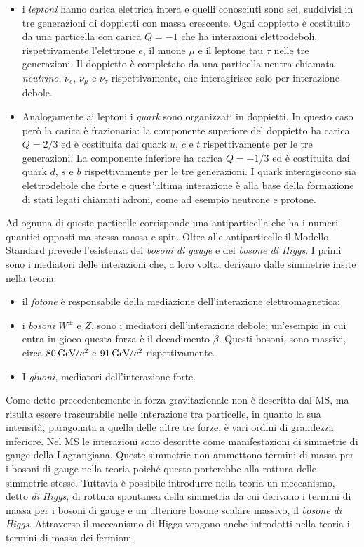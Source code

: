 \begin{itemize}
\item i {\em leptoni} hanno carica elettrica intera e quelli conosciuti sono sei, suddivisi in tre generazioni di doppietti con massa crescente. Ogni doppietto è costituito da una particella con carica $Q=-1$ che ha interazioni elettrodeboli, rispettivamente l'elettrone $e$, il muone $\mu$ e il leptone tau $\tau$ nelle tre generazioni. Il doppietto \`e completato da una particella neutra chiamata {\em neutrino}, $\nu_e$, $\nu_{\mu}$ e $\nu_{\tau}$ rispettivamente, che interagirisce solo per interazione debole.
\item Analogamente ai leptoni i {\em quark} sono organizzati in doppietti. In questo caso però la carica è frazionaria: la componente superiore del doppietto ha carica $Q=2/3$ ed \`e costituita dai quark $u$, $c$ e $t$ rispettivamente per le tre generazioni. La componente inferiore ha carica $Q=-1/3$ ed \`e costituita dai quark $d$, $s$ e $b$ rispettivamente per le tre generazioni. I quark interagiscono sia elettrodebole che forte e quest'ultima interazione è alla base della formazione di stati legati chiamati adroni, come ad esempio neutrone e protone.
\end{itemize}

Ad ognuna di queste particelle corrisponde una antiparticella che ha i numeri quantici opposti ma stessa massa e spin. Oltre alle antiparticelle il Modello Standard prevede l'esistenza dei {\em bosoni di gauge} e del {\em bosone di Higgs}. I primi sono i mediatori delle interazioni che, a loro volta, derivano dalle simmetrie insite nella teoria:

\begin{itemize}
\item il {\em fotone} \`e responsabile della mediazione dell'interazione elettromagnetica;
\item i {\em bosoni $W^{\pm}$} e $Z$, sono i mediatori dell'interazione debole; un'esempio in cui entra in gioco questa forza è il decadimento $\beta$. Questi bosoni, sono massivi, circa $80{\rm \, Ge\kern-0.125em V}\kern-0.125em /c^2$ e $91{\rm \, Ge\kern-0.125em V}\kern-0.125em /c^2$ rispettivamente.
\item I {\em gluoni}, mediatori dell'interazione forte.
\end{itemize}

Come detto precedentemente la forza gravitazionale non è descritta dal MS, ma risulta essere trascurabile nelle interazione tra particelle, in quanto la sua intensità, paragonata a quella delle altre tre forze, è vari ordini di grandezza inferiore. Nel MS le interazioni sono descritte come manifestazioni di simmetrie di gauge della Lagrangiana. Queste simmetrie non ammettono termini di massa per i bosoni di gauge nella teoria poiché questo porterebbe alla rottura delle simmetrie stesse. Tuttavia \`e possibile introdurre nella teoria un meccanismo, detto {\em di Higgs}, di rottura spontanea della simmetria da cui derivano i termini di massa per i bosoni di gauge e un ulteriore bosone scalare massivo, il {\em bosone di Higgs}. Attraverso il meccanismo di Higgs vengono anche introdotti nella teoria i termini di massa dei fermioni.

